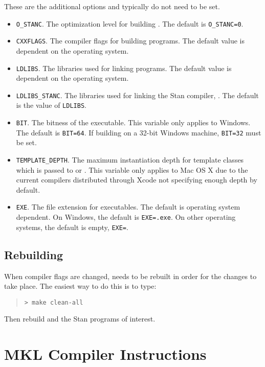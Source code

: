 These are the additional options and typically do not need to be set.
%
\begin{itemize}
  \item \Verb|O_STANC|. The optimization level for building
    . The default is \Verb|O_STANC=0|.
  \item \Verb|CXXFLAGS|. The compiler flags for building \CmdStan
    programs. The default value is dependent on the operating system.
  \item \Verb|LDLIBS|. The libraries used for linking \CmdStan
    programs. The default value is dependent on the operating system.
  \item \Verb|LDLIBS_STANC|. The libraries used for linking the Stan
    compiler, . The default is the value of \Verb|LDLIBS|.
  \item \Verb|BIT|. The bitness of the executable. This variable only
    applies to Windows. The default is \Verb|BIT=64|. If building on a
    32-bit Windows machine, \Verb|BIT=32| must be set.
  \item \Verb|TEMPLATE_DEPTH|. The maximum instantiation depth for
    template classes which is passed to \gpp or \clang. This variable
    only applies to Mac OS X due to the current compilers distributed
    through Xcode not specifying enough depth by default.
  \item \Verb|EXE|. The file extension for executables. The default is
    operating system dependent. On Windows, the default is
    \Verb|EXE=.exe|. On other operating systems, the default is empty,
    \Verb|EXE=|.
\end{itemize}
%

\subsection{Rebuilding \CmdStan}

When compiler flags are changed, \CmdStan needs to be rebuilt in order
for the changes to take place. The easiest way to do this is to type:
%
\begin{quote}
  \begin{Verbatim}[fontshape=sl]
> make clean-all
  \end{Verbatim}
\end{quote}
%
Then rebuild \CmdStan and the Stan programs of interest.


\section{MKL Compiler Instructions}

